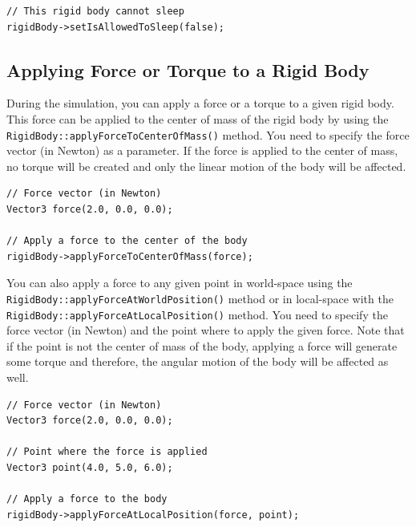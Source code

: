 \documentclass[a4paper,12pt]{article}
\begin{document}
   \begin{lstlisting}
// This rigid body cannot sleep
rigidBody->setIsAllowedToSleep(false);
 \end{lstlisting}

    \subsection{Applying Force or Torque to a Rigid Body}

    During the simulation, you can apply a force or a torque to a given rigid body. This force can be applied to the center of mass of the rigid body
    by using the \texttt{RigidBody::\allowbreak applyForceToCenterOfMass()} method. You need to specify the force vector (in Newton) as a parameter. If
    the force is applied to the center of mass, no torque will be created and only the linear motion of the body will be affected. \\

    \begin{lstlisting}
// Force vector (in Newton)
Vector3 force(2.0, 0.0, 0.0);

// Apply a force to the center of the body
rigidBody->applyForceToCenterOfMass(force);
  \end{lstlisting}

    \vspace{0.6cm}

     \begin{sloppypar}
    You can also apply a force to any given point in world-space using the \texttt{RigidBody::applyForceAtWorldPosition()} method or in
    local-space with the \texttt{RigidBody::applyForceAtLocalPosition()} method. You need to specify the force vector (in Newton) and the point
    where to apply the given force. Note that if the point is not the center of mass of the body, applying a force will generate some torque and
    therefore, the angular motion of the body will be affected as well. \\
     \end{sloppypar}

    \begin{lstlisting}
// Force vector (in Newton)
Vector3 force(2.0, 0.0, 0.0);

// Point where the force is applied
Vector3 point(4.0, 5.0, 6.0);

// Apply a force to the body
rigidBody->applyForceAtLocalPosition(force, point);
  \end{lstlisting}
\end{document}
